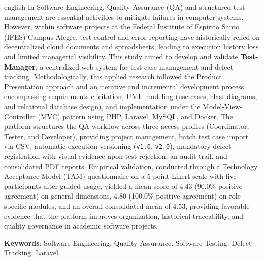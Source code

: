 \begin{resumo}[Abstract]
 \begin{otherlanguage*}{english}
In Software Engineering, Quality Assurance (QA) and structured test management are essential activities to mitigate failures in computer systems. However, within software projects at the Federal Institute of Espírito Santo (IFES) Campus Alegre, test control and error reporting have historically relied on decentralized cloud documents and spreadsheets, leading to execution history loss and limited managerial visibility. This study aimed to develop and validate \textbf{Test-Manager}, a centralized web system for test case management and defect tracking. Methodologically, this applied research followed the Product Presentation approach and an iterative and incremental development process, encompassing requirements elicitation, UML modeling (use cases, class diagrams, and relational database design), and implementation under the Model-View-Controller (MVC) pattern using PHP, Laravel, MySQL, and Docker. The platform structures the QA workflow across three access profiles (Coordinator, Tester, and Developer), providing project management, batch test case import via CSV, automatic execution versioning (\texttt{v1.0}, \texttt{v2.0}), mandatory defect registration with visual evidence upon test rejection, an audit trail, and consolidated PDF reports. Empirical validation, conducted through a Technology Acceptance Model (TAM) questionnaire on a 5-point Likert scale with five participants after guided usage, yielded a mean score of 4.43 (90.0\% positive agreement) on general dimensions, 4.80 (100.0\% positive agreement) on role-specific modules, and an overall consolidated mean of 4.53, providing favorable evidence that the platform improves organization, historical traceability, and quality governance in academic software projects.

 \textbf{Keywords}: Software Engineering. Quality Assurance. Software Testing. Defect Tracking. Laravel.
 \end{otherlanguage*}
\end{resumo}